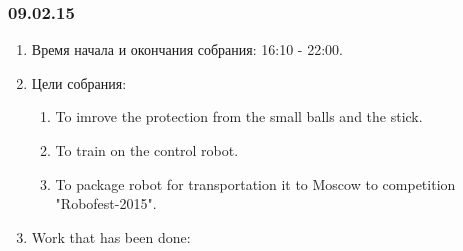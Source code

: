\subsubsection{09.02.15}
\begin{enumerate}
	
	\item Время начала и окончания собрания: 16:10 - 22:00.
	
	\item Цели собрания: 
	\begin{enumerate}
		
		\item To imrove the protection from the small balls and the stick. 
		
		\item To train on the control robot.
		
		\item To package robot for transportation it to Moscow to competition "Robofest-2015".
		
	\end{enumerate}

	\item Work that has been done:
	\begin{enumerate}
		

\end{enumerate}
\end{enumerate}
